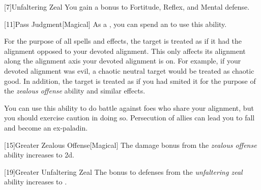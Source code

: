             [7]{Unfaltering Zeal}
            You gain a  bonus to Fortitude, Reflex, and Mental defense.

            [11]{Pass Judgment}[Magical] As a , you can spend an  to use this ability.
            \begin{ability}
                \begin{spelltargetinginfo}
                \end{spelltargetinginfo}
                \begin{spelleffects}
                    \spelleffect For the purpose of all spells and effects, the target is treated as if it had the alignment opposed to your devoted alignment.
                    This only affects its alignment along the alignment axis your devoted alignment is on.
                    For example, if your devoted alignment was evil, a chaotic neutral target would be treated as chaotic good.
                    In addition, the target is treated as if you had smited it for the purpose of the \textit{zealous offense} ability and similar effects.

                    You can use this ability to do battle against foes who share your alignment, but you should exercise caution in doing so.
                    Persecution of allies can lead you to fall and become an ex-paladin.
                \end{spelleffects}
            \end{ability}

            [15]{Greater Zealous Offense}[Magical]
            The damage bonus from the \textit{zealous offense} ability increases to \plus2d.

            [19]{Greater Unfaltering Zeal}
            The bonus to defenses from the \textit{unfaltering zeal} ability increases to .


